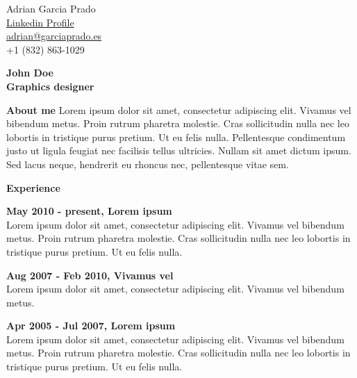 \documentclass[a4paper,10pt,final]{memoir}
\newcommand{\Sep}{\vspace{1.5em}}
\newcommand{\SmallSep}{\vspace{0.5em}}
\newenvironment{AboutMe}
  {\ignorespaces\textbf{\color{RoyalBlue} About me}}
  {\Sep\ignorespacesafterend}
\newcommand{\CVSection}[1]
  {\Large\textbf{#1}\par
  \SmallSep\normalsize\normalfont}
\newcommand{\CVItem}[1]
  {\textbf{\color{RoyalBlue} #1}}
\newcommand{\LinkedinWeb}{https://www.linkedin.com/in/adriangarciaprado}
\begin{document}
%

\begin{flushright}\small
  Adrian Garcia Prado \\
  \href{\LinkedinWeb}{Linkedin Profile} \\
  \url{adrian@garciaprado.es}  \\
  +1 (832) 863-1029 \\
\end{flushright}\normalsize
\framebreak


\Huge\bfseries {\color{RoyalBlue} John Doe} \\
\Large\bfseries  Graphics designer \\

\normalsize\normalfont

\begin{AboutMe}
Lorem ipsum dolor sit amet, consectetur adipiscing elit. Vivamus vel bibendum metus. Proin rutrum pharetra molestie. Cras sollicitudin nulla nec leo lobortis in tristique purus pretium. Ut eu felis nulla. Pellentesque condimentum justo ut ligula feugiat nec facilisis tellus ultricies. Nullam sit amet dictum ipsum. Sed lacus neque, hendrerit eu rhoncus nec, pellentesque vitae sem.
\end{AboutMe}

\CVSection{Experience}
\CVItem{May 2010 - present, Lorem ipsum}\\
Lorem ipsum dolor sit amet, consectetur adipiscing elit. Vivamus vel bibendum metus. Proin rutrum pharetra molestie. Cras sollicitudin nulla nec leo lobortis in tristique purus pretium. Ut eu felis nulla.
\SmallSep

\CVItem{Aug 2007 - Feb 2010, Vivamus vel}\\
Lorem ipsum dolor sit amet, consectetur adipiscing elit. Vivamus vel bibendum metus.
\SmallSep

\CVItem{Apr 2005 - Jul 2007, Lorem ipsum}\\
Lorem ipsum dolor sit amet, consectetur adipiscing elit. Vivamus vel bibendum metus. Proin rutrum pharetra molestie. Cras sollicitudin nulla nec leo lobortis in tristique purus pretium. Ut eu felis nulla.
\SmallSep
\end{document}
